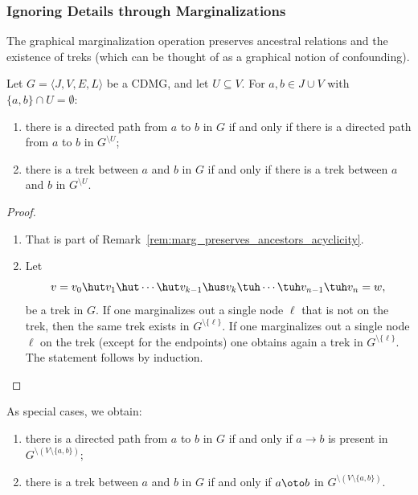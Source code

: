 
\subsubsection{Ignoring Details through Marginalizations}

The graphical marginalization operation preserves ancestral relations and the existence of treks
(which can be thought of as a graphical notion of confounding).
\begin{Prp}\label{prp:marginalization_preserves_causes_treks}
  Let $G = \langle J, V, E, L \rangle$ be a CDMG, and let $U \subseteq V$. For $a,b \in J \cup V$ with $\{a,b\} \cap U = \emptyset$:
\begin{enumerate}
  \item there is a directed path from $a$ to $b$ in $G$ if and only if there is a directed path from $a$ to $b$ in $G^{\setminus U}$;
  \item there is a trek between $a$ and $b$ in $G$ if and only if there is a trek between $a$ and $b$ in $G^{\setminus U}$.
\end{enumerate}
\end{Prp}
\begin{proof}
  \begin{enumerate}
    \item That is part of Remark~\ref{rem:marg_preserves_ancestors_acyclicity}.
    \item Let
        \[v=v_0 \hut v_1 \hut  \cdots \hut v_{k-1} \hus v_k  \tuh \cdots \tuh v_{n-1} \tuh v_n=w,\]
        be a trek in $G$. If one marginalizes out a single node $\ell$ that is not on the trek,
        then the same trek exists in $G^{\setminus\{\ell\}}$. If one marginalizes out a single node
        $\ell$ on the trek (except for the endpoints) one obtains again a trek in $G^{\setminus\{\ell\}}$. 
        The statement follows by induction.
  \end{enumerate}
\end{proof}
\begin{Rem}
  As special cases, we obtain:
    \begin{enumerate}
      \item there is a directed path from $a$ to $b$ in $G$ if and only if $a \to b$ is present in $G^{\setminus (V\setminus\{a,b\})}$;
      \item there is a trek between $a$ and $b$ in $G$ if and only if $a \oto b$ in $G^{\setminus (V\setminus\{a,b\})}$.
    \end{enumerate}
\end{Rem}

